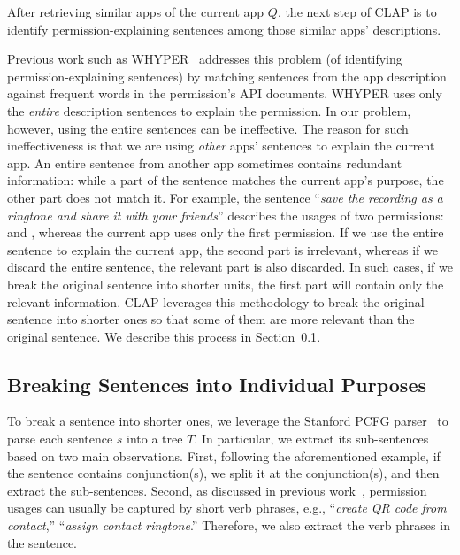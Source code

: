 After retrieving similar apps of the current app $Q$, the next step of CLAP is to identify permission-explaining sentences among those similar apps' descriptions. 

Previous work such as WHYPER~\cite{conf/uss/PanditaXYEX13} addresses this problem (of identifying permission-explaining sentences) by matching sentences from the app description against frequent words in the permission's API documents. 
WHYPER uses only the \emph{entire} description sentences to explain the permission. 
In our problem, however, using the entire sentences can be ineffective. 
The reason for such ineffectiveness is that we are using \emph{other} apps' sentences to explain the current app. 
An entire sentence from another app sometimes contains redundant information: while a part of the sentence matches the current app's purpose, the other part does not match it. 
For example, the sentence ``\emph{save the recording as a ringtone and share it with your friends}'' describes the usages of two permissions:  and , whereas the current app uses only the first permission. 
If we use the entire sentence to explain the current app, the second part is irrelevant, whereas if we discard the entire sentence, the relevant part is also discarded. 
In such cases, if we break the original sentence into shorter units, the first part will contain only the relevant information. 
CLAP leverages this methodology to break the original sentence into shorter ones so that some of them are more relevant than the original sentence. 
We describe this process in Section~\ref{sec:candidate}. 

\subsection{Breaking Sentences into Individual Purposes}
\label{sec:candidate}


To break a sentence into shorter ones, we leverage the Stanford PCFG parser~\cite{Klein2003} to parse each sentence $s$ into a tree $T$. 
In particular, we extract its sub-sentences based on two main observations. 
First, following the aforementioned example, if the sentence contains conjunction(s), we split it at the conjunction(s), and then extract the sub-sentences. 
Second, as discussed in previous work~\cite{conf/uss/PanditaXYEX13,conf/ccs/QuRZCZC14}, permission usages can usually be captured by short verb phrases, e.g., ``\emph{create QR code from contact},'' ``\emph{assign contact ringtone}.'' 
Therefore, we also extract the verb phrases in the sentence. 


